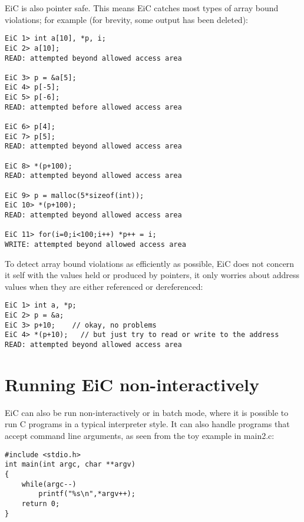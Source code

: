 \documentclass[12pt]{report}
\begin{document}
EiC is also pointer safe. This means EiC catches most types of array
bound violations; for example (for brevity, some output has been
deleted):
\begin{production}
\begin{verbatim}
EiC 1> int a[10], *p, i;
EiC 2> a[10];
READ: attempted beyond allowed access area

EiC 3> p = &a[5];
EiC 4> p[-5];
EiC 5> p[-6];
READ: attempted before allowed access area

EiC 6> p[4];
EiC 7> p[5];
READ: attempted beyond allowed access area

EiC 8> *(p+100);
READ: attempted beyond allowed access area

EiC 9> p = malloc(5*sizeof(int));
EiC 10> *(p+100);
READ: attempted beyond allowed access area

EiC 11> for(i=0;i<100;i++) *p++ = i;
WRITE: attempted beyond allowed access area
\end{verbatim}
\end{production}

To detect array bound violations as efficiently as possible, EiC does
not concern it self with the values held or produced by pointers, it
only worries about address values when they are either referenced or
dereferenced:
\begin{production}
\begin{verbatim}
EiC 1> int a, *p;
EiC 2> p = &a;
EiC 3> p+10;    // okay, no problems
EiC 4> *(p+10);   // but just try to read or write to the address
READ: attempted beyond allowed access area
\end{verbatim}
\end{production}

\section{Running EiC non-interactively}

EiC can also be run non-interactively or in batch mode, where it is
possible to run C programs in a typical interpreter style. It can also
handle programs that accept command line arguments, as seen from the
toy example in main2.c:

\begin{production}
\begin{verbatim}
#include <stdio.h>
int main(int argc, char **argv)
{
    while(argc--)
        printf("%s\n",*argv++);
    return 0;
}
\end{verbatim}
\end{production}
\end{document}
